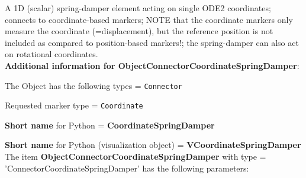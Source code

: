 \label{sec:item:ObjectConnectorCoordinateSpringDamper}
A 1D (scalar) spring-damper element acting on single ODE2 coordinates; connects to coordinate-based markers; NOTE that the coordinate markers only measure the coordinate (=displacement), but the reference position is not included as compared to position-based markers!; the spring-damper can also act on rotational coordinates.\vspace{12pt}
 \\{\bf Additional information for ObjectConnectorCoordinateSpringDamper}:
\bi
  \item The Object has the following types = \texttt{Connector}
  \item Requested marker type = \texttt{Coordinate}
  \item {\bf Short name} for Python = {\bf CoordinateSpringDamper}  \item {\bf Short name} for Python (visualization object) = {\bf VCoordinateSpringDamper}\ei
\vspace{12pt} \noindent The item {\bf ObjectConnectorCoordinateSpringDamper} with type = 'ConnectorCoordinateSpringDamper' has the following parameters:\vspace{-1cm}\\ 
